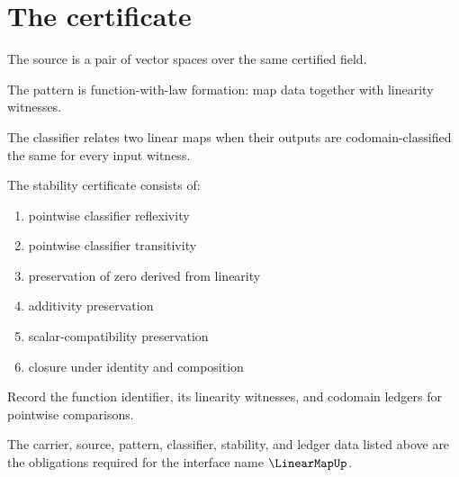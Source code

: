 \section{The certificate}

\begin{definition}
\label{def:linearmap-source-specification}
The source is a pair of vector spaces over the same certified field.
\end{definition}

\begin{definition}
\label{def:linearmap-pattern-specification}
The pattern is function-with-law formation: map data together with linearity witnesses.
\end{definition}

\begin{definition}
\label{def:linearmap-classifier-specification}
The classifier relates two linear maps when their outputs are codomain-classified the same for every input witness.
\end{definition}

\begin{definition}
\label{def:linearmap-stability-certificate}
The stability certificate consists of:
\begin{enumerate}
  \item pointwise classifier reflexivity
  \item pointwise classifier transitivity
  \item preservation of zero derived from linearity
  \item additivity preservation
  \item scalar-compatibility preservation
  \item closure under identity and composition
\end{enumerate}
\end{definition}

\begin{definition}
\label{def:linearmap-ledger-policy}
Record the function identifier, its linearity witnesses, and codomain ledgers for pointwise comparisons.
\end{definition}

\begin{definition}
\label{def:linearmap-certificate-obligations}
The carrier, source, pattern, classifier, stability, and ledger data listed above are the obligations required for the interface name \(\LinearMapUp\).
\end{definition}

